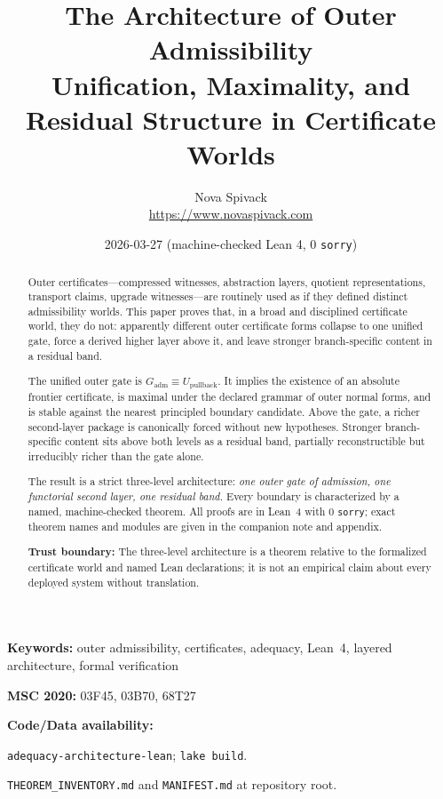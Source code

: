 \documentclass[11pt]{article}
\title{\textbf{The Architecture of Outer Admissibility}\\[6pt]
  \large Unification, Maximality, and Residual Structure in Certificate Worlds}
\author{Nova Spivack\\[2pt]
  \small \url{https://www.novaspivack.com}}
\date{2026-03-27 \quad (machine-checked Lean 4, 0 \texttt{sorry})}
\theoremstyle{plain}
\theoremstyle{definition}
\theoremstyle{remark}
\newcommand{\Gadm}{G_{\mathrm{adm}}}
\newcommand{\Upb}{U_{\mathrm{pullback}}}
\begin{document}
\maketitle
\NovaZenodoAfterTitle


\begin{abstract}
\raggedright
Outer certificates---compressed witnesses, abstraction layers, quotient
representations, transport claims, upgrade witnesses---are routinely used as
if they defined distinct admissibility worlds.  This paper proves that, in a
broad and disciplined certificate world, they do not: apparently different
outer certificate forms collapse to one unified gate, force a derived higher
layer above it, and leave stronger branch-specific content in a residual band.

The unified outer gate is $\Gadm \equiv \Upb$.  It implies the existence of an
absolute frontier certificate, is maximal under the declared grammar of outer
normal forms, and is stable against the nearest principled boundary candidate.
Above the gate, a richer second-layer package is canonically forced without
new hypotheses.  Stronger branch-specific content sits above both levels as a
residual band, partially reconstructible but irreducibly richer than the gate
alone.

The result is a strict three-level architecture:
\emph{one outer gate of admission, one functorial second layer, one residual
band.}  Every boundary is characterized by a named, machine-checked theorem.
All proofs are in Lean~4 with 0 \texttt{sorry}; exact theorem names and modules
are given in the companion note and appendix.

\textbf{Trust boundary:} The three-level architecture is a theorem relative to the formalized certificate world and named Lean declarations; it is not an empirical claim about every deployed system without translation.

\NovaZenodoInAbstract
\end{abstract}

\noindent\textbf{Keywords:} outer admissibility, certificates, adequacy, Lean~4,
layered architecture, formal verification

\noindent\textbf{MSC 2020:} 03F45, 03B70, 68T27

\noindent\textbf{Code/Data availability:}

\noindent\texttt{adequacy-architecture-lean}; \texttt{lake build}.

\noindent\texttt{THEOREM\_INVENTORY.md} and \texttt{MANIFEST.md} at repository root.
\end{document}
